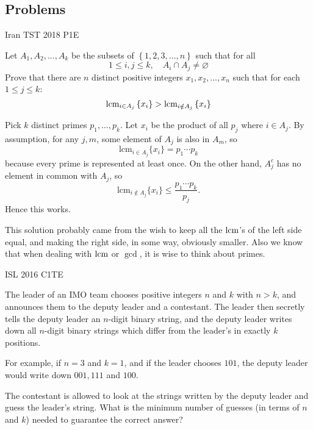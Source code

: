 \newpage
\subsection{Problems}

{Iran TST 2018 P1}{E}{
    Let $A_1, A_2, ... , A_k$ be the subsets of $\left\{1,2,3,...,n\right\}$
    such that for all 
    \[1\leq i,j\leq k, \quad A_i\cap A_j \neq \varnothing\]
    Prove that there are $n$ distinct positive integers $x_1,x_2,...,x_n$ such
    that for each $1\leq j\leq k$: 
    \[\mbox{lcm}_{i \in A_j}\left\{x_i\right\}>\mbox{lcm}_{i \notin A_j}\left\{x_i\right\}\]

}

\begin{solution}[elegance, a1267ab]
    Pick $k$ distinct primes $p_1, \dotsc, p_k$. Let $x_i$ be the product of all $p_j$ where $i\in A_j$. By assumption, for any $j, m$, some element of $A_j$ is also in $A_m$, so
\[\mathrm{lcm}_{i\in A_j}\{x_i\}=p_1\dotsm p_k\]because every prime is represented at least once. On the other hand, $A_j^{c}$ has no element in common with $A_j$, so
\[\mathrm{lcm}_{i\not\in A_j}\{x_i\}\leq \frac{p_1\dotsm p_k}{p_j}.\]Hence this works.
\end{solution}

\begin{Remark}
    This solution probably came from the wish to keep all the $\mbox{lcm}$'s of the
    left side equal, and making the right side, in some way, obviously
    smaller. Also we know that when dealing with $\mbox{lcm}$ or $\gcd$, it is wise
    to think about primes.
\end{Remark}



{ISL 2016 C1}{TE}{
    The leader of an IMO team chooses positive integers $n$ and $k$
    with $n > k$, and announces them to the deputy leader and a contestant. The
    leader then secretly tells the deputy leader an $n$-digit binary string,
    and the deputy leader writes down all $n$-digit binary strings which differ
    from the leader’s in exactly $k$ positions. 

    For example, if $n = 3$ and $k = 1$, and if the leader chooses $101$, the
    deputy leader would write down $001, 111$ and $100$.

    The contestant is allowed to look at the strings written by the deputy
    leader and guess the leader’s string. What is the minimum number of
    guesses (in terms of $n$ and $k$) needed to guarantee the correct answer?

}\label{problem:constructive_algo_10}

